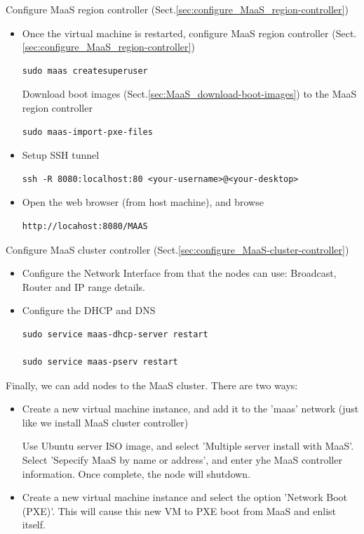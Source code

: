 Configure MaaS region controller (Sect.\ref{sec:configure_MaaS_region-controller})
\begin{itemize}
  \item Once the virtual machine is restarted, configure MaaS region controller
  (Sect.\ref{sec:configure_MaaS_region-controller})
\begin{verbatim}
sudo maas createsuperuser
\end{verbatim}

  Download boot images (Sect.\ref{sec:MaaS_download-boot-images}) to the MaaS
  region controller
\begin{verbatim}
sudo maas-import-pxe-files
\end{verbatim}

  \item Setup SSH tunnel
\begin{verbatim}
ssh -R 8080:localhost:80 <your-username>@<your-desktop>
\end{verbatim}

  \item Open the web browser (from host machine), and browse
\begin{verbatim}
http://locahost:8080/MAAS
\end{verbatim}
\end{itemize}

Configure MaaS cluster controller (Sect.\ref{sec:configure_MaaS-cluster-controller})
\begin{itemize}
  \item Configure the Network Interface from that the nodes can use: Broadcast,
  Router and IP range details.
  
  \item Configure the DHCP and DNS
\begin{verbatim}
sudo service maas-dhcp-server restart

sudo service maas-pserv restart
\end{verbatim}
\end{itemize}

Finally, we can add nodes to the MaaS cluster. There are two ways:
\begin{itemize}
  \item Create a new virtual machine instance, and add it to the 'maas' network
  (just like we install MaaS cluster controller)
  
  Use Ubuntu server ISO image, and select 'Multiple server install with MaaS'.
  Select 'Sepecify MaaS by name or address', and enter yhe MaaS controller
  information. Once complete, the node will shutdown.
  
  \item Create a new virtual machine instance and select the option 'Network
  Boot (PXE)'. This will cause this new VM to PXE boot from MaaS and enlist
  itself.
\end{itemize}

